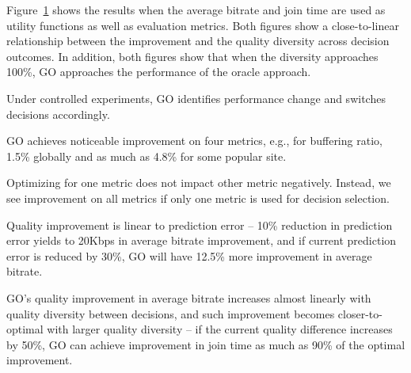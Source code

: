 \begin{figure}[h!]
\centering
{}
\hspace{-0.6cm}

\label{fig:trace-diversity}
\end{figure}

Figure~\ref{fig:trace-diversity} shows the results when the average
bitrate and join time are used as utility functions as well as
evaluation metrics. Both figures show a close-to-linear relationship
between the improvement and the quality diversity across decision
outcomes.  In addition, both figures show that when the diversity
approaches 100\%, GO approaches the performance of the oracle
approach.


\begin{packedenumerate}
	\item Under controlled experiments, GO identifies performance change and switches decisions accordingly.
	\item GO achieves noticeable improvement on four metrics, e.g., for buffering ratio, 1.5\% globally and as much as 4.8\% for some popular site.
	\item Optimizing for one metric does not impact other metric negatively. Instead, we see improvement on all metrics if only one metric is used for decision selection.
	\item Quality improvement is linear to prediction error -- 10\% reduction in prediction error yields to 20Kbps in average bitrate improvement, and if current prediction error is reduced by 30\%, GO will have 12.5\% more improvement in average bitrate.
	\item GO's quality improvement in average bitrate increases almost linearly with quality diversity between decisions, and such improvement becomes closer-to-optimal with larger quality diversity -- if the current quality difference increases by 50\%, GO can achieve improvement in join time as much as 90\% of the optimal improvement.
\end{packedenumerate}



